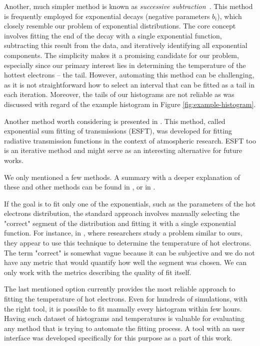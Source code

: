 Another, much simpler method is known as \textit{successive subtraction}~\cite{wiscombe1977}. This method is frequently employed for exponential decays (negative parameters $b_i$), which closely resemble our problem of exponential distributions. The core concept involves fitting the end of the decay with a single exponential function, subtracting this result from the data, and iteratively identifying all exponential components. The simplicity makes it a promising candidate for our problem, especially since our primary interest lies in determining the temperature of the hottest electrons -- the tail. However, automating this method can be challenging, as it is not straightforward how to select an interval that can be fitted as a tail in each iteration. Moreover, the tails of our histograms are not reliable as was discussed with regard of the example histogram in Figure \ref{fig:example-histogram}.

Another method worth considering is presented in \cite{wiscombe1977}. This method, called exponential sum fitting of transmissions (ESFT), was developed for fitting radiative transmission functions in the context of atmospheric research. ESFT too is an iterative method and might serve as an interesting alternative for future works.

We only mentioned a few methods. A summary with a deeper explanation of these and other methods can be found in \cite{wiscombe1977}, \cite{holmstrom2002} or in \cite{hokanson2013}.

If the goal is to fit only one of the exponentials, such as the parameters of the hot electrons distribution, the standard approach involves manually selecting the "correct" segment of the distribution and fitting it with a single exponential function. For instance, in \cite{cui2013}, where researchers study a problem similar to ours, they appear to use this technique to determine the temperature of hot electrons. The term "correct" is somewhat vague because it can be subjective and we do not have any metric that would quantify how well the segment was chosen. We can only work with the metrics describing the quality of fit itself.

The last mentioned option currently provides the most reliable approach to fitting the temperature of hot electrons. Even for hundreds of simulations, with the right tool, it is possible to fit manually every histogram within few hours. Having such dataset of histograms and temperatures is valuable for evaluating any method that is trying to automate the fitting process. A tool with an user interface was developed specifically for this purpose as a part of this work.

